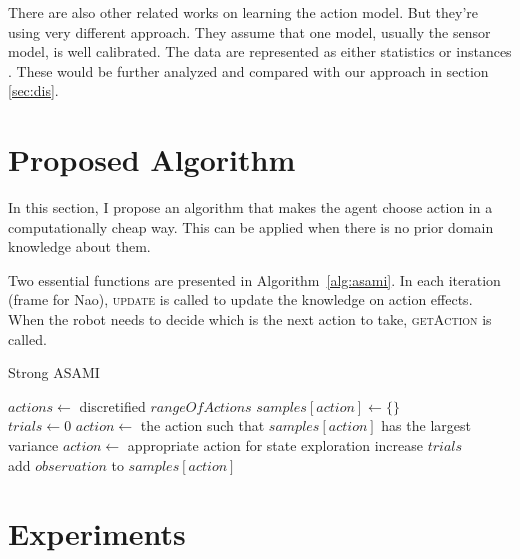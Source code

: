 \documentclass[10pt]{IEEEtran}
\begin{document}
There are also other related works on learning the action model. But
they're using very different approach. They assume that one model,
usually the sensor model, is well calibrated. The data are represented
as either statistics \cite{And_learningand} or instances
\cite{LNAI2007-ahmadi}. These would be further analyzed and compared
with our approach in section \ref{sec:dis}.

\section{Proposed Algorithm}

In this section, I propose an algorithm that makes the agent choose
action in a computationally cheap way. This can be applied when there
is no prior domain knowledge about them. 

Two essential functions are presented in Algorithm~\ref{alg:asami}. In
each iteration (frame for Nao), \textsc{update} is called to update
the knowledge on action effects. When the robot needs to decide which
is the next action to take, \textsc{getAction} is called.

\begin{algorithm*}[t]
\caption{Strong ASAMI}\label{alg:asami}
\begin{algorithmic}
    \State $actions \gets$ discretified $rangeOfActions$
        $samples[action] \gets \{\}$ 
    \EndFor
\EndFunction
\\
 
\State $trials\gets 0$
            \State $action \gets$ the action such that $samples[action]$ has the largest variance
        \Else
            \State $action \gets$ appropriate action for state exploration
        \EndIf
        \State increase $trials$
    \EndWhile
\EndFunction
\\
 
    \State add $observation$ to $samples[action]$
\EndFunction
\end{algorithmic}
\end{algorithm*}

\section{Experiments}
\end{document}

